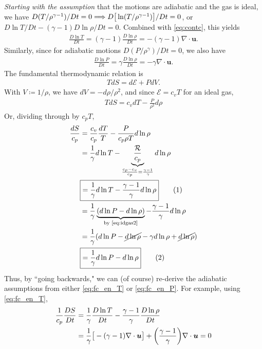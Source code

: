 \documentclass[12pt]{article} %
\newcommand\numberthis{\addtocounter{equation}{1}\tag{\theequation}}
\begin{document}
	\textit{Starting with the assumption} that the motions are adiabatic and the gas is ideal, we have $D(T/\rho^{\gamma-1})/Dt = 0\Longrightarrow D\big{[}\ln(T/\rho^{\gamma-1})\big{]}/Dt=0$, or $D\ln T/Dt - (\gamma-1) D\ln\rho/Dt=0$. Combined with \eqref{eq:contc}, this yields
	\begin{align}
	\frac{D\ln T}{Dt} = (\gamma - 1)\frac{D\ln\rho}{Dt} = -(\gamma - 1)\nabla\cdot\bm{u}.
			\label{eq:fc_en_T}
	\end{align}
	Similarly, since for adiabatic motions $D(P/\rho^\gamma)/Dt = 0$, we also have
	\begin{align}
		\frac{D\ln P}{Dt} = \gamma\frac{D\ln\rho}{Dt} = -\gamma\nabla\cdot\bm{u}.
		\label{eq:fc_en_P}
	\end{align}
	The fundamental thermodynamic relation is
	\begin{align*}
	TdS = d\mathcal{E} + PdV.
	\end{align*}
	With $V\coloneqq1/\rho$, we have $dV = -d\rho/\rho^2$, and since $\mathcal{E}=c_vT$ for an ideal gas,
	\begin{align*}
	TdS = c_vdT-\frac{P}{\rho^2}d\rho
	\end{align*}
	Or, dividing through by $c_pT$,
	\begin{subequations}\label{eq:ftr}
	\begin{align*}
	\frac{dS}{c_p}&= \frac{c_v}{c_p}\frac{dT}{T} - \frac{P}{c_p\rho T}d\ln\rho\\
	&= \frac{1}{\gamma}d\ln T - \underbrace{\frac{\mathcal{R}}{c_p}}_{\frac{c_p-c_v}{c_p}=\frac{\gamma - 1}{\gamma}}d\ln\rho\\
	&\boxed{= \frac{1}{\gamma}d\ln T - \frac{\gamma-1}{\gamma}d\ln\rho}\label{eq:ftra}\numberthis\\
	&= \frac{1}{\gamma}\underbrace{(d\ln P - d\ln\rho)}_{\text{by \eqref{eq:idgas2}}} - \frac{\gamma - 1}{\gamma}d\ln\rho\\
	&= \frac{1}{\gamma}(d\ln P - \cancel{d\ln\rho}-\gamma d\ln\rho + \cancel{d\ln\rho})\\
	&\boxed{= \frac{1}{\gamma}d\ln P - d\ln\rho}\label{eq:ftrb}\numberthis
	\end{align*}
	\end{subequations}
	Thus, by ``going backwards," we can (of course) re-derive the adiabatic assumptions from either \eqref{eq:fc_en_T} or \eqref{eq:fc_en_P}. For example, using \eqref{eq:fc_en_T},
	\begin{align}
	\frac{1}{c_p}\frac{DS}{Dt} &= \frac{1}{\gamma}\frac{D\ln T}{Dt} - \frac{\gamma-1}{\gamma}\frac{D\ln\rho}{Dt}\nonumber\\
	&= \frac{1}{\gamma}\big{[}-(\gamma-1)\nabla\cdot\bm{u}\big{]}+ \bigg{(}\frac{\gamma-1}{\gamma}\bigg{)}\nabla\cdot\bm{u} = 0
	\label{eq:fc_en_S}
	\end{align}
	
\end{document}

